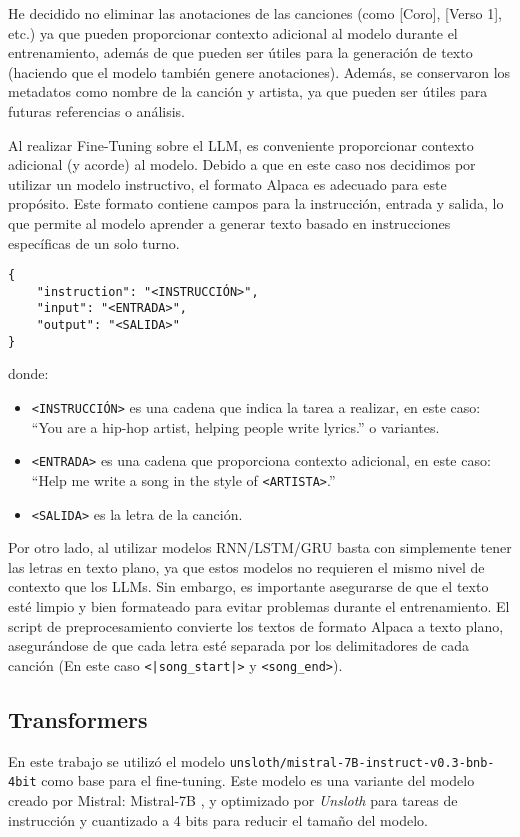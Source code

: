 \documentclass[paper=letter, fontsize=11pt, draft=false]{scrartcl}
\numberwithin{equation}{section} %
\numberwithin{figure}{section} %
\numberwithin{table}{section} %
\numberwithin{subsection}{section}
\begin{document}
He decidido no eliminar las anotaciones de las canciones (como [Coro], [Verso 1], etc.) ya que pueden proporcionar contexto adicional al modelo durante el entrenamiento, además de que pueden ser útiles para la generación de texto (haciendo que el modelo también genere anotaciones). Además, se conservaron los metadatos como nombre de la canción y artista, ya que pueden ser útiles para futuras referencias o análisis.

Al realizar Fine-Tuning sobre el LLM, es conveniente proporcionar contexto adicional (y acorde) al modelo. Debido a que en este caso nos decidimos por utilizar un modelo instructivo, el formato Alpaca es adecuado para este propósito. Este formato contiene campos para la instrucción, entrada y salida, lo que permite al modelo aprender a generar texto basado en instrucciones específicas de un solo turno.
\begin{verbatim}
{
    "instruction": "<INSTRUCCIÓN>",
    "input": "<ENTRADA>",
    "output": "<SALIDA>"
}
\end{verbatim}

donde:
\begin{itemize} 
    \item \texttt{<INSTRUCCIÓN>} es una cadena que indica la tarea a realizar, en este caso: ``You are a hip-hop artist, helping people write lyrics.'' o variantes.
    \item \texttt{<ENTRADA>} es una cadena que proporciona contexto adicional, en este caso: ``Help me write a song in the style of \texttt{<ARTISTA>}.''
    \item \texttt{<SALIDA>} es la letra de la canción.
\end{itemize}

Por otro lado, al utilizar modelos RNN/LSTM/GRU basta con simplemente tener las letras en texto plano, ya que estos modelos no requieren el mismo nivel de contexto que los LLMs. Sin embargo, es importante asegurarse de que el texto esté limpio y bien formateado para evitar problemas durante el entrenamiento. El script de preprocesamiento convierte los textos de formato Alpaca a texto plano, asegurándose de que cada letra esté separada por los delimitadores de cada canción (En este caso \texttt{<|song\_start|>} y \texttt{<song\_end>}).


\subsection{Transformers}

En este trabajo se utilizó el modelo \texttt{unsloth/mistral-7B-instruct-v0.3-bnb-4bit} como base para el fine-tuning. Este modelo es una variante del modelo creado por Mistral: Mistral-7B \cite{jiang2023mistral7b}, y optimizado por \textit{Unsloth} para tareas de instrucción y cuantizado a 4 bits para reducir el tamaño del modelo.
\end{document}
